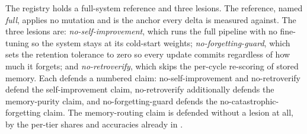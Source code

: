 \begin{precise}
The registry holds a full-system reference and three lesions. The reference, named
\emph{full}, applies no mutation and is the anchor every delta is measured against. The
three lesions are: \emph{no-self-improvement}, which runs the full pipeline with no
fine-tuning so the system stays at its cold-start weights; \emph{no-forgetting-guard},
which sets the retention tolerance to zero so every update commits regardless of how
much it forgets; and \emph{no-retroverify}, which skips the per-cycle re-scoring of
stored memory. Each defends a numbered claim: no-self-improvement and no-retroverify
defend the self-improvement claim, no-retroverify additionally defends the memory-purity
claim, and no-forgetting-guard defends the no-catastrophic-forgetting claim. The
memory-routing claim is defended without a lesion at all, by the per-tier shares and
accuracies already in .
\end{precise}

